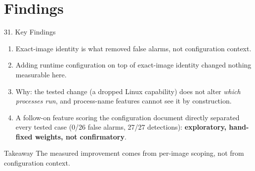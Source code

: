 \documentclass[aspectratio=169, 11pt]{beamer}
\begin{document}
\section{Findings}
\begin{frame}{31. Key Findings}
    \footnotesize
    \begin{enumerate}\setlength\itemsep{4pt}
        \item Exact-image identity is what removed false alarms, not configuration context.
        \item Adding runtime configuration on top of exact-image identity changed nothing measurable here.
        \item Why: the tested change (a dropped Linux capability) does not alter \emph{which processes run}, and process-name features cannot see it by construction.
        \item A follow-on feature scoring the configuration document directly separated every tested case (0/26 false alarms, 27/27 detections): \textbf{exploratory, hand-fixed weights, not confirmatory}.
    \end{enumerate}
    \begin{block}{\scriptsize Takeaway}
        \scriptsize The measured improvement comes from per-image scoping, not from configuration context.
    \end{block}
\end{frame}

\end{document}
